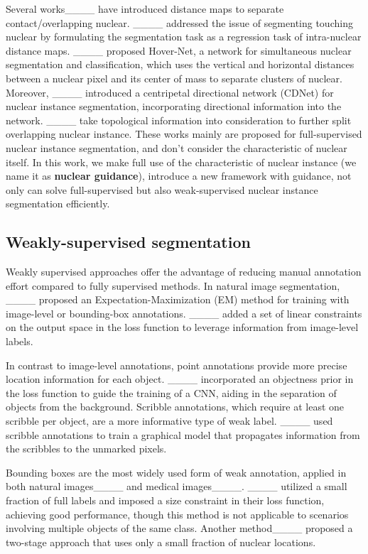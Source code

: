 Several works____ have introduced distance maps to separate contact/overlapping nuclear. 
____ addressed the issue of segmenting touching nuclear by formulating the segmentation task as a regression task of intra-nuclear distance maps.
____ proposed Hover-Net, a network for simultaneous nuclear segmentation and classification, which uses the vertical and horizontal distances between a nuclear pixel and its center of mass to separate clusters of nuclear. 
Moreover, ____ introduced a centripetal directional network (CDNet) for nuclear instance segmentation, incorporating directional information into the network. ____ take topological information into consideration to further split overlapping nuclear instance.
These works mainly are proposed for full-supervised nuclear instance segmentation, and don't consider the characteristic of nuclear itself.
In this work, we make full use of the characteristic of nuclear instance (we name it as \textbf{nuclear guidance}), introduce a new framework with guidance, not only can solve full-supervised but also weak-supervised nuclear instance segmentation efficiently.

\subsection{Weakly-supervised segmentation}
Weakly supervised approaches offer the advantage of reducing manual annotation effort compared to fully supervised methods. 
In natural image segmentation, ____ proposed an Expectation-Maximization (EM) method for training with image-level or bounding-box annotations. ____ added a set of linear constraints on the output space in the loss function to leverage information from image-level labels.

In contrast to image-level annotations, point annotations provide more precise location information for each object. ____ incorporated an objectness prior in the loss function to guide the training of a CNN, aiding in the separation of objects from the background. Scribble annotations, which require at least one scribble per object, are a more informative type of weak label. ____ used scribble annotations to train a graphical model that propagates information from the scribbles to the unmarked pixels.

Bounding boxes are the most widely used form of weak annotation, applied in both natural images____ and medical images____. 
____ utilized a small fraction of full labels and imposed a size constraint in their loss function, achieving good performance, though this method is not applicable to scenarios involving multiple objects of the same class. Another method____ proposed a two-stage approach that uses only a small fraction of nuclear locations.

